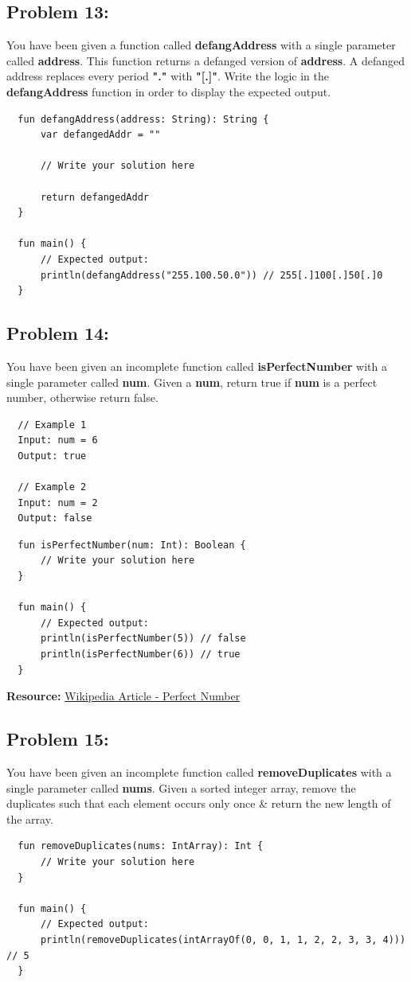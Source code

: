 \documentclass{article}
\begin{document}
\subsection*{Problem 13:}
You have been given a function called \textbf{defangAddress} with a single parameter called \textbf{address}. This function returns a defanged version of \textbf{address}. A defanged address replaces every period \textbf{"."} with \textbf{"[.]"}. Write the logic in the \textbf{defangAddress} function in order to display the expected output.

\begin{verbatim}
  fun defangAddress(address: String): String {
      var defangedAddr = ""

      // Write your solution here

      return defangedAddr
  }

  fun main() {
      // Expected output:
      println(defangAddress("255.100.50.0")) // 255[.]100[.]50[.]0
  }
\end{verbatim}

\subsection*{Problem 14:}
You have been given an incomplete function called \textbf{isPerfectNumber} with a single parameter called \textbf{num}. Given a \textbf{num}, return true if \textbf{num} is a perfect number, otherwise return false.

\begin{verbatim}
  // Example 1
  Input: num = 6
  Output: true

  // Example 2
  Input: num = 2
  Output: false
\end{verbatim}

\begin{verbatim}
  fun isPerfectNumber(num: Int): Boolean {
      // Write your solution here
  }

  fun main() {
      // Expected output:
      println(isPerfectNumber(5)) // false
      println(isPerfectNumber(6)) // true
  }
\end{verbatim}

\textbf{Resource:} \href{https://en.wikipedia.org/wiki/Perfect_number}{Wikipedia Article - Perfect Number}

\subsection*{Problem 15:}
You have been given an incomplete function called \textbf{removeDuplicates} with a single parameter called \textbf{nums}. Given a sorted integer array, remove the duplicates such that each element occurs only once \& return the new length of the array.

\begin{verbatim}
  fun removeDuplicates(nums: IntArray): Int {
      // Write your solution here  
  }

  fun main() {
      // Expected output:
      println(removeDuplicates(intArrayOf(0, 0, 1, 1, 2, 2, 3, 3, 4))) // 5
  }
\end{verbatim}
\end{document}
